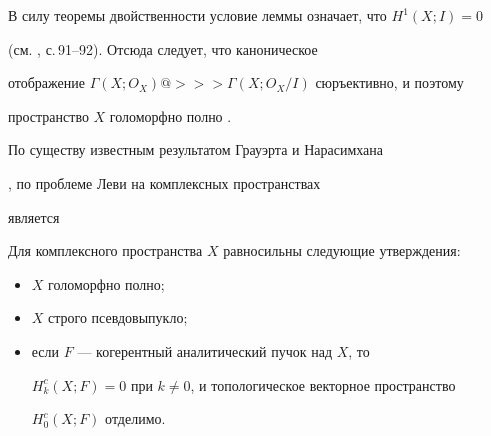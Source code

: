  


\begin{pf} 


В силу теоремы двойственности условие леммы означает, что $H^1(X;I)=0$ 


(см. \cite{1}, с.\,91--92). Отсюда следует, что каноническое 


отображение $\Gamma(X;O_X)@>>>\Gamma(X;O_X/I)$ сюръективно, и поэтому 


пространство $X$ голоморфно полно \cite{2}. 


\end{pf} 


 


По существу известным результатом Грауэрта \cite{6} и Нарасимхана 


\cite{4}, \cite{5} по проблеме Леви на комплексных пространствах 


является 


 


\begin{cornonum} 


Для комплексного пространства $X$ равносильны следующие утверждения:


\begin{itemize} 


\item[a)] $X$ голоморфно полно; 


\item[б)] $X$ строго псевдовыпукло; 


\item[в)] если $F$ --- когерентный аналитический пучок над $X$, то 


$H^c_k(X;F)=0$ при $k\ne 0$, и топологическое векторное пространство 


$H^c_0(X;F)$ отделимо. 


\end{itemize} 


\end{cornonum} 


 


